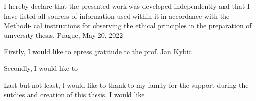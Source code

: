 \begin{declaration}
    I hereby declare that the presented work
    was developed independently and that I
    have listed all sources of information used
    within it in accordance with the Methodi-
    cal instructions for observing the ethical
    principles in the preparation of university
    thesis.
    \medskip
    Prague, May 20, 2022

\end{declaration}

\begin{thanks}
    Firstly, I would like to epress gratitude to the prof. Jan Kybic

    Secondly, I would like to

    Last but not least, I would like to thank to my family for the support during the sutdies and creation of this thesis. I would like
\end{thanks}